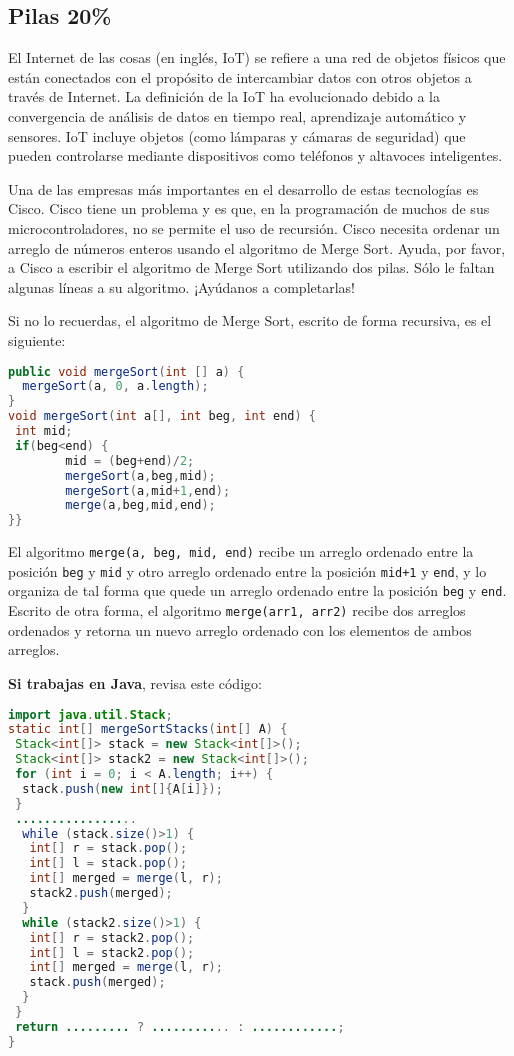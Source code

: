 \documentclass[10 pt]{article}
\begin{document}
\begin{multicols}{2}
\section{Pilas 20\%}
El Internet de las cosas (en inglés, IoT) se refiere a una red de objetos físicos que están conectados con el propósito de intercambiar datos con otros objetos a través de Internet. La definición de la IoT ha evolucionado debido a la convergencia de análisis de datos en tiempo real, aprendizaje automático y sensores. IoT incluye objetos (como lámparas y cámaras de seguridad)  que pueden controlarse mediante dispositivos como teléfonos y altavoces inteligentes. 

Una de las empresas más importantes en el desarrollo de estas tecnologías es Cisco. Cisco tiene un problema y es que, en la programación de muchos de sus microcontroladores, no se permite el uso de recursión. Cisco necesita ordenar un arreglo de números enteros usando el algoritmo de Merge Sort. Ayuda, por favor, a Cisco a escribir el algoritmo de Merge Sort utilizando dos pilas. Sólo le faltan algunas líneas a su algoritmo. ¡Ayúdanos a completarlas! 

Si no lo recuerdas, el algoritmo de Merge Sort, escrito de forma recursiva, es el siguiente:
{\footnotesize
\begin{lstlisting}[language=Java]
public void mergeSort(int [] a) {
  mergeSort(a, 0, a.length);
}
void mergeSort(int a[], int beg, int end) {  
 int mid;  
 if(beg<end) {  
        mid = (beg+end)/2;  
        mergeSort(a,beg,mid);  
        mergeSort(a,mid+1,end);  
        merge(a,beg,mid,end);  
}}  
\end{lstlisting}
}

El algoritmo \texttt{merge(a, beg, mid, end)} recibe un arreglo ordenado entre la posición \texttt{beg} y \texttt{mid} y otro arreglo ordenado entre la posición \texttt{mid+1} y \texttt{end}, 
y lo organiza de tal forma que quede un arreglo ordenado entre la posición \texttt{beg} y \texttt{end}. Escrito de otra forma, 
el algoritmo \texttt{merge(arr1, arr2)} recibe dos arreglos ordenados y retorna un nuevo arreglo ordenado con los elementos de ambos arreglos. 

\textbf{Si trabajas en Java}, revisa este código:

{\footnotesize
\begin{lstlisting}[language=Java]
import java.util.Stack;
static int[] mergeSortStacks(int[] A) {
 Stack<int[]> stack = new Stack<int[]>();
 Stack<int[]> stack2 = new Stack<int[]>();
 for (int i = 0; i < A.length; i++) {
  stack.push(new int[]{A[i]});
 }
 .................
  while (stack.size()>1) {
   int[] r = stack.pop();
   int[] l = stack.pop();
   int[] merged = merge(l, r);
   stack2.push(merged);
  }
  while (stack2.size()>1) {
   int[] r = stack2.pop();
   int[] l = stack2.pop();
   int[] merged = merge(l, r);
   stack.push(merged);
  }
 }
 return ......... ? ........... : ............;
}
\end{lstlisting}
}


\end{multicols}
\end{document}

